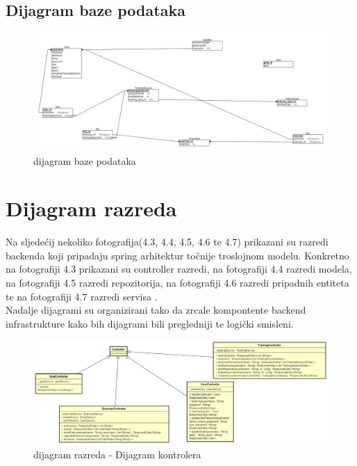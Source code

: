 {{{{{{				
			
			\subsection{Dijagram baze podataka}
			
			\begin{figure}[H]
				\includegraphics[scale=0.3]{dijagrami/image (8).png} %
				\centering
				\caption{dijagram baze podataka}
				\label{fig:diagramRAZ2}
			\end{figure}
			
			
		\section{Dijagram razreda}
		
			{Na sljedećij nekoliko fotografija(4.3, 4.4, 4.5, 4.6 te 4.7) prikazani su razredi backenda koji pripadaju spring arhitektur točnije troslojnom modelu. Konkretno na fotografiji 4.3 prikazani su controller razredi, na fotografiji 4.4 razredi modela, na fotografiji 4.5 razredi repozitorija, na fotografiji 4.6 razredi pripadnih entiteta te na fotografiji 4.7 razredi servisa .}\\
			
			{Nadalje dijagrami su organizirani tako da zrcale  kompontente backend infrastrukture kako bih dijagrami bili pregledniji te logički smisleni.}\\
			
			
			\begin{figure}[H]
				\includegraphics[scale=0.3]{dijagrami/ControllerFinalVersion.png} %
				\centering
				\caption{dijagram razreda - Dijagram kontrolera}
				\label{fig:diagramRAZ1}
			\end{figure}
		
}}}}}}
